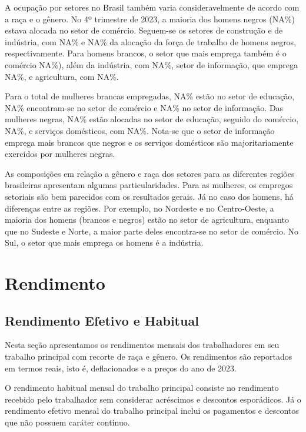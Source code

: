 \documentclass[
]{article}
\begin{document}
A ocupação por setores no Brasil também varia consideravelmente de
acordo com a raça e o gênero. No 4º trimestre de 2023, a maioria dos
homens negros (NA\%) estava alocada no setor de comércio. Seguem-se os
setores de construção e de indústria, com NA\% e NA\% da alocação da
força de trabalho de homens negros, respectivamente. Para homens
brancos, o setor que mais emprega também é o comércio NA\%), além da
indústria, com NA\%, setor de informação, que emprega NA\%, e
agricultura, com NA\%.

Para o total de mulheres brancas empregadas, NA\% estão no setor de
educação, NA\% encontram-se no setor de comércio e NA\% no setor de
informação. Das mulheres negras, NA\% estão alocadas no setor de
educação, seguido do comércio, NA\%, e serviços domésticos, com NA\%.
Nota-se que o setor de informação emprega mais brancos que negros e os
serviços domésticos são majoritariamente exercidos por mulheres negras.

As composições em relação a gênero e raça dos setores para as diferentes
regiões brasileiras apresentam algumas particularidades. Para as
mulheres, os empregos setoriais são bem parecidos com os resultados
gerais. Já no caso dos homens, há diferenças entre as regiões. Por
exemplo, no Nordeste e no Centro-Oeste, a maioria dos homens (brancos e
negros) estão no setor de agricultura, enquanto que no Sudeste e Norte,
a maior parte deles encontra-se no setor de comércio. No Sul, o setor
que mais emprega os homens é a indústria.

\hypertarget{rendimento}{%
\section{Rendimento}\label{rendimento}}

\hypertarget{rendimento-efetivo-e-habitual}{%
\subsection{Rendimento Efetivo e
Habitual}\label{rendimento-efetivo-e-habitual}}

Nesta seção apresentamos os rendimentos mensais dos trabalhadores em seu
trabalho principal com recorte de raça e gênero. Os rendimentos são
reportados em termos reais, isto é, deflacionados e a preços do ano de
2023.

O rendimento habitual mensal do trabalho principal consiste no
rendimento recebido pelo trabalhador sem considerar acréscimos e
descontos esporádicos. Já o rendimento efetivo mensal do trabalho
principal inclui os pagamentos e descontos que não possuem caráter
contínuo.
\end{document}
